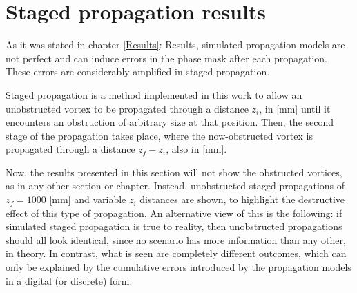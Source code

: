 \newpage
\section{Staged propagation results}

As it was stated in chapter \ref{Results}: Results, simulated propagation models are not perfect and can induce errors in the phase mask after each propagation. These errors are considerably amplified in staged propagation.

Staged propagation is a method implemented in this work to allow an unobstructed vortex to be propagated through a distance $z_i$, in [mm] until it encounters an obstruction of arbitrary size at that position. Then, the second stage of the propagation takes place, where the now-obstructed vortex is propagated through a distance $z_f - z_i$, also in [mm].

Now, the results presented in this section will not show the obstructed vortices, as in any other section or chapter. Instead, unobstructed staged propagations of $z_f = 1000$ [mm] and variable $z_i$ distances are shown, to highlight the destructive effect of this type of propagation. An alternative view of this is the following: if simulated staged propagation is true to reality, then unobstructed propagations should all look identical, since no scenario has more information than any other, in theory. In contrast, what is seen are completely different outcomes, which can only be explained by the cumulative errors introduced by the propagation models in a digital (or discrete) form.

